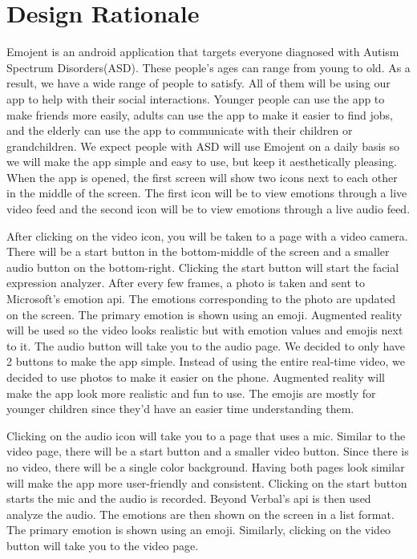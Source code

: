 \chapter{Design Rationale}
Emojent is an android application that targets everyone diagnosed with Autism Spectrum Disorders(ASD). These people’s ages can range from young to old. As a result, we have a wide range of people to satisfy. All of them will be using our app to help with their social interactions. Younger people can use the app to make friends more easily, adults can use the app to make it easier to find jobs, and the elderly can use the app to communicate with their children or grandchildren. We expect people with ASD will use Emojent on a daily basis so we will make the app simple and easy to use, but keep it aesthetically pleasing. When the app is opened, the first screen will show two icons next to each other in the middle of the screen. The first icon will be to view emotions through a live video feed and the second icon will be to view emotions through a live audio feed.

After clicking on the video icon, you will be taken to a page with a video camera. There will be a start button in the bottom-middle of the screen and a smaller audio button on the bottom-right. Clicking the start button will start the facial expression analyzer. After every few frames, a photo is taken and sent to Microsoft’s emotion api. The emotions corresponding to the photo are updated on the screen. The primary emotion is shown using an emoji. Augmented reality will be used so the video looks realistic but with emotion values and emojis next to it. The audio button will take you to the audio page. We decided to only have 2 buttons to make the app simple. Instead of using the entire real-time video, we decided to use photos to make it easier on the phone. Augmented reality will make the app look more realistic and fun to use. The emojis are mostly for younger children since they’d have an easier time understanding them. 

Clicking on the audio icon will take you to a page that uses a mic. Similar to the video page, there will be a start button and a smaller video button. Since there is no video, there will be a single color background. Having both pages look similar will make the app more user-friendly and consistent. Clicking on the start button starts the mic and the audio is recorded. Beyond Verbal’s api is then used analyze the audio. The emotions are then shown on the screen in a list format. The primary emotion is shown using an emoji. Similarly, clicking on the video button will take you to the video page.

